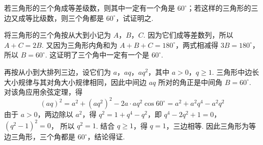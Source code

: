 \begin{problem}
若三角形的三个角成等差级数，则其中一定有一个角是 \(60^{\circ}\)；若这样的三角形的三边又成等比级数，则三个角都是 \(60^{\circ}\)，试证明之.
\end{problem}

\begin{solution}
将三角形的三个角按从大到小记为 \(A\)，\(B\)，\(C\). 因为它们成等差数列，所以 \(A+C=2B\). 又因为三角形内角和为 \(A+B+C=180^{\circ}\)，两式相减得 \(3B=180^{\circ}\)，所以 \(B=60^{\circ}\). 这证明了三个角中一定有一个是 \(60^{\circ}\).

再按从小到大排列三边，设它们为 \(a\)，\(aq\)，\(aq^{2}\)，其中 \(a>0\)，\(q\geq1\). 三角形中边长大小规律与其对角大小规律相同，因此中间边 \(aq\) 所对的角正是中间角 \(B=60^{\circ}\). 对该角应用余弦定理，得
\[
(aq)^{2}=a^{2}+(aq^{2})^{2}-2a\cdot aq^{2}\cos60^{\circ}=a^{2}+a^{2}q^{4}-a^{2}q^{2}
\]
由于 \(a>0\)，两边除以 \(a^{2}\)，得 \(q^{2}=1+q^{4}-q^{2}\)，即
\(q^{4}-2q^{2}+1=0\)，\(\left(q^{2}-1\right)^{2}=0\)，
所以 \(q^{2}=1\). 结合 \(q\geq1\)，得 \(q=1\)，三边相等. 因此三角形为等边三角形，三个角都是 \(60^{\circ}\)，结论得证.
\end{solution}
